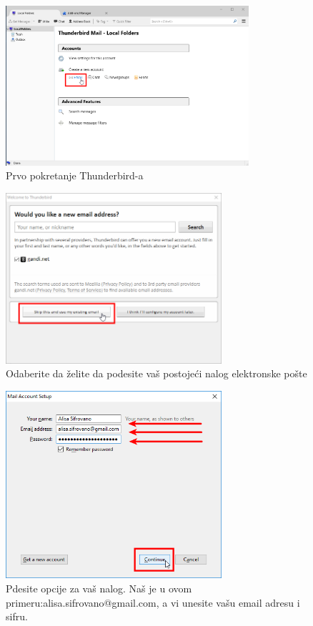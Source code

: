 \documentclass[a4paper,11pt]{article}
\begin{document}
\begin{figure}[!h]
	\begin{center}
		\includegraphics[width=9cm]{27_Mozilla_Thunderbird.png}
		\caption{Prvo pokretanje Thunderbird-a}
		\label{initialscreen}
	\end{center}
\end{figure}
\newpage
\begin{figure}[!h]
	\begin{center}
		\includegraphics[width=8cm]{28_Mozilla_Thunderbird_email_setup.png}
		\caption{Odaberite da \v{z}elite da podesite va\v{s} postoje\'{c}i nalog elektronske po\v{s}te}
		\label{initialscreen}
	\end{center}
\end{figure}
\begin{figure}[!h]
	\begin{center}
		\includegraphics[width=8cm]{29_Mozilla_Thunderbird_email_credentials.png}
		\caption{Pdesite opcije za va\v{s} nalog. Na\v{s} je u ovom primeru:\newline alisa.sifrovano@gmail.com, a vi unesite va\v{s}u email adresu i sifru.}
		\label{initialscreen}
	\end{center}
\end{figure}
\end{document}
